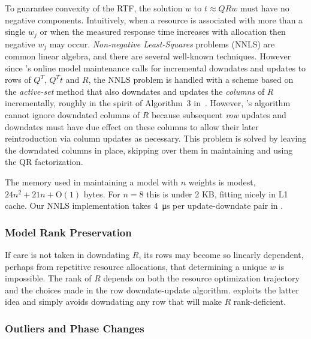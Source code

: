 To guarantee convexity of the RTF, the solution $w$ to $t \approx QRw$ must have no negative components.
Intuitively, when a resource is associated with more than a single $w_j$
or when the measured response time increases with allocation then negative $w_j$ may occur. \emph{Non-negative Least-Squares} problems (NNLS) are common linear algebra, and there are several well-known techniques\cite{ChPl}.
However since \pacora's online model maintenance calls for
incremental downdates and updates to rows of $Q^T$, $Q^Tt$ and $R$,
the NNLS problem is handled with a scheme
based on the \emph{active-set} method\cite{LaHa} that
also downdates and updates the \emph{columns} of $R$ incrementally,
roughly in the spirit of Algorithm~3 in~\cite{LuDu}.
However, \pacora's algorithm cannot ignore downdated columns of $R$
because subsequent \emph{row} updates and downdates must have due effect
on these columns to allow their later reintroduction via column updates as necessary.
This problem is solved by leaving the downdated columns in place,
skipping over them in maintaining and using the QR factorization.

The memory used in maintaining a model with $n$ weights is modest, $24n^2 + 21n + \textrm{O}(1)$ bytes.
For $n = 8$ this is under 2 KB, fitting nicely in L1 cache.
Our NNLS implementation takes \SI{4}{\micro\second} per update-downdate pair in \tess.

\subsubsection*{Model Rank Preservation}
If care is not taken in downdating $R$, its rows may become so linearly dependent,
perhaps from repetitive resource allocations,
that determining a unique $w$ is impossible.
The rank of $R$ depends on both the resource optimization trajectory and the
choices made in the row downdate-update algorithm.
\pacora exploits the latter idea and simply avoids downdating any row that will make $R$ rank-deficient.

\subsubsection*{Outliers and Phase Changes}


